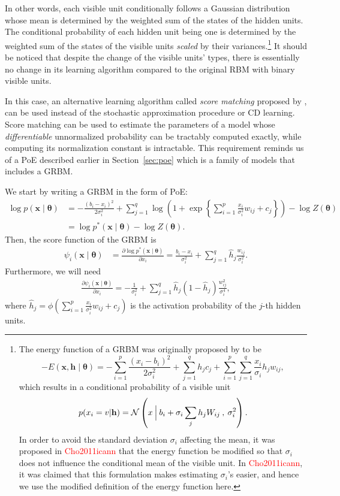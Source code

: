 \documentclass{now}
\newcommand{\vect}[1]{\mathbf{#1}}
\newcommand{\vects}[1]{\boldsymbol{#1}}
\newcommand{\vh}[0]{\vect{h}}
\newcommand{\vx}[0]{\vect{x}}
\newcommand{\TT}[0]{{\vects{\theta}}}
\newcommand{\alert}[1]{\textcolor{red}{#1}}
\newcommand{\N}[0]{\mathcal{N}}
\newcommand{\citepub}[1]{\alert{#1}}
\begin{document}
In other words, each visible unit conditionally follows a
Gaussian distribution whose mean is determined by the
weighted sum of the states of the hidden units. The
conditional probability of each hidden unit being one is
determined by the weighted sum of the states of the visible
units \textit{scaled} by their variances.\footnote{
The energy function of a GRBM was originally proposed by
\citet{Hinton2006} to be
\[
    -E(\vx, \vh \mid \TT) = -\sum_{i=1}^p \frac{(x_i -
    b_i)^2}{2\sigma_i^2} + \sum_{j=1}^q h_j c_j +
    \sum_{i=1}^p \sum_{j=1}^q \frac{x_i}{\sigma_i} h_j
    w_{ij},
\]
which results in a conditional probability of a visible unit 
\[
p(x_i = v | \vh) = \N \left(x \:\Bigl|\: b_i + 
\sigma_i \sum_j h_j W_{ij} \:,\: \sigma_i^2 \right).
\]
In order to avoid the standard deviation $\sigma_i$
affecting the mean, it was proposed in
\citepub{Cho2011icann} that the energy function be modified
so that $\sigma_i$ does not influence the conditional mean
of the visible unit.  In \citepub{Cho2011icann}, it was
claimed that this formulation makes estimating $\sigma_i$'s
easier, and hence we use the modified definition of the energy
function here.
}
It should be noticed that despite the change of the visible
units' types, there is essentially no change in its learning
algorithm compared to the original RBM with binary visible
units.

In this case, an alternative learning algorithm called
\textit{score matching} proposed by \citet{Hyvarinen2005},
can be used instead of the stochastic approximation
procedure or CD learning. Score matching can be used to
estimate the parameters of a model whose
\textit{differentiable} unnormalized probability can be
tractably computed exactly, while computing its
normalization constant is intractable. This requirement
reminds us of a PoE described earlier in
Section~\ref{sec:poe} which is a family of models that
includes a GRBM.

We start by writing a GRBM in the form of PoE:
\begin{align}
    \label{eq:grbm_poe}
    \log p(\vx \mid \TT) &= -\frac{(b_i - x_i)^2}{2\sigma_i^2}
    + \sum_{j=1}^q \log \left( 1 + \exp\left\{ \sum_{i=1}^p
    \frac{x_i}{\sigma_i^2} w_{ij} + c_j \right\}\right) -
    \log Z(\TT) 
    \nonumber \\
    &= \log p^*(\vx \mid \TT)  - \log Z(\TT).
\end{align}
Then, the score function of the GRBM is
\begin{align}
    \label{eq:grbm_score}
    \psi_i (\vx \mid \TT) &= \frac{\partial \log p^*(\vx \mid
    \TT)}{\partial x_i} 
    = \frac{b_i - x_i}{\sigma_i^2} + \sum_{j=1}^q \hat{h}_j
    \frac{w_{ij}}{\sigma_i^2}.
\end{align}
Furthermore, we will need
\begin{align*}
    \frac{\partial \psi_i(\vx \mid \TT)}{\partial x_i} =
    -\frac{1}{\sigma_i^2} + \sum_{j=1}^q \hat{h}_j (1 -
    \hat{h}_j) \frac{w_{ij}^2}{\sigma_i^4},
\end{align*}
where $\hat{h}_j = \phi\left( \sum_{i=1}^p
\frac{x_i}{\sigma_i^2} w_{ij} + c_j \right)$ is the
activation probability of the $j$-th hidden units.
\end{document}

